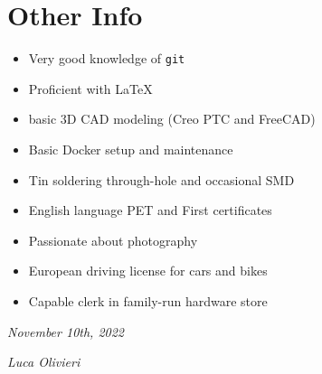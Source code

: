 \documentclass[]{friggeri-cv}
\begin{document}
\section{Other Info}
\vspace{-7pt}
\begin{itemize}
	\itemsep-0.2em
	\item Very good knowledge of \verb|git|
	\item Proficient with \LaTeX\
    \item basic 3D CAD modeling (Creo PTC and FreeCAD)
	\item Basic Docker setup and maintenance
	\item Tin soldering through-hole and occasional SMD
	\item English language PET and First certificates
	\item Passionate about photography
	\item European driving license for cars and bikes	
	\item Capable clerk in family-run hardware store	
\end{itemize}

\begin{flushright}
\emph{November 10th, 2022}
\end{flushright}
\begin{flushright}
\emph{Luca Olivieri}
\end{flushright}
\end{document}

